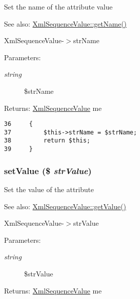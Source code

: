 Set the name of the attribute value

\begin{Desc}
\item[See also:]\hyperlink{class_xml_sequence_value_3d0963e68bb313b163a73f2803c64600}{XmlSequenceValue::getName()} 

XmlSequenceValue-$>$strName \end{Desc}
\begin{Desc}
\item[Parameters:]
\begin{description}
\item[{\em string}]\$strName \end{description}
\end{Desc}
\begin{Desc}
\item[Returns:]\hyperlink{class_xml_sequence_value}{XmlSequenceValue} me \end{Desc}


\begin{Code}\begin{verbatim}36     {
37         $this->strName = $strName;
38         return $this;
39     }
\end{verbatim}
\end{Code}


\hypertarget{class_xml_sequence_value_b5d79fa8a006bc1c112844b24f3e4897}{
\subsubsection[{setValue}]{\setlength{\rightskip}{0pt plus 5cm}setValue (\$ {\em strValue})}}
\label{class_xml_sequence_value_b5d79fa8a006bc1c112844b24f3e4897}


Set the value of the attribute

\begin{Desc}
\item[See also:]\hyperlink{class_xml_sequence_value_c0bc18784b182c89fcfd276625aef435}{XmlSequenceValue::getValue()} 

XmlSequenceValue-$>$strValue \end{Desc}
\begin{Desc}
\item[Parameters:]
\begin{description}
\item[{\em string}]\$strValue \end{description}
\end{Desc}
\begin{Desc}
\item[Returns:]\hyperlink{class_xml_sequence_value}{XmlSequenceValue} me \end{Desc}


